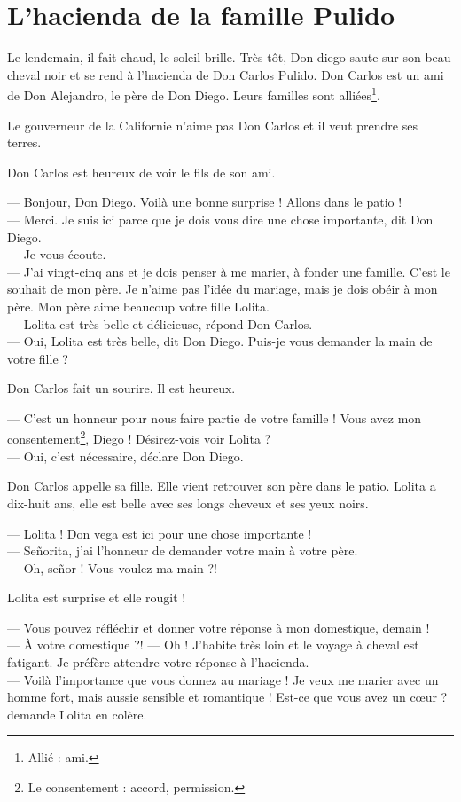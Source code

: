 \chapter{L'hacienda de la famille Pulido}
Le lendemain, il fait chaud, le soleil brille. Très tôt, Don diego saute sur son beau cheval noir et se rend à
l'hacienda de Don Carlos Pulido. Don Carlos est un ami de Don Alejandro, le père de Don Diego. Leurs familles sont
alliées\footnote{Allié : ami.}.

Le gouverneur de la Californie n'aime pas Don Carlos et il veut prendre ses terres.

Don Carlos est heureux de voir le fils de son ami.

--- Bonjour, Don Diego. Voilà une bonne surprise ! Allons dans le patio !\\
--- Merci. Je suis ici parce que je dois vous dire une chose importante, dit Don Diego.\\
--- Je vous écoute.\\
--- J'ai vingt-cinq ans et je dois penser à me marier, à fonder une famille. C'est le souhait de mon père. Je n'aime
    pas l'idée du mariage, mais je dois obéir à mon père. Mon père aime beaucoup votre fille Lolita.\\
--- Lolita est très belle et délicieuse, répond Don Carlos.\\
--- Oui, Lolita est très belle, dit Don Diego. Puis-je vous demander la main de votre fille ?

Don Carlos fait un sourire. Il est heureux.

--- C'est un honneur pour nous faire partie de votre famille ! Vous avez mon consentement\footnote{Le consentement :
    accord, permission.}, Diego ! Désirez-vois voir Lolita ?\\
--- Oui, c'est nécessaire, déclare Don Diego.

Don Carlos appelle sa fille. Elle vient retrouver son père dans le patio. Lolita a dix-huit ans, elle est belle avec
ses longs cheveux et ses yeux noirs.

--- Lolita ! Don vega est ici pour une chose importante !\\
--- Señorita, j'ai l'honneur de demander votre main à votre père.\\
--- Oh, señor ! Vous voulez ma main ?!

Lolita est surprise et elle rougit !

--- Vous pouvez réfléchir et donner votre réponse à mon domestique, demain !\\
--- À votre domestique ?!
--- Oh ! J'habite très loin et le voyage à cheval est fatigant. Je préfère attendre votre réponse à l'hacienda.\\
--- Voilà l'importance que vous donnez au mariage ! Je veux me marier avec un homme fort, mais aussie sensible et
    romantique ! Est-ce que vous avez un cœur ? demande Lolita en colère.

